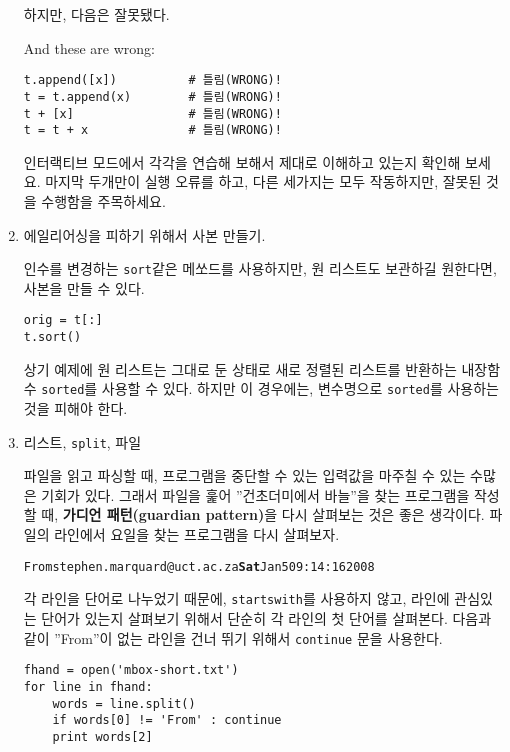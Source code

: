 \begin{enumerate}
하지만, 다음은 잘못됐다.

And these are wrong:

\beforeverb
\begin{verbatim}
t.append([x])          # 틀림(WRONG)!
t = t.append(x)        # 틀림(WRONG)!
t + [x]                # 틀림(WRONG)!
t = t + x              # 틀림(WRONG)!
\end{verbatim}
\afterverb

인터랙티브 모드에서 각각을 연습해 보해서 제대로 이해하고 있는지 확인해 보세요.
마지막 두개만이 실행 오류를 하고, 다른 세가지는 모두 작동하지만, 잘못된 것을 수행함을 주목하세요.

\item 에일리어싱을 피하기 위해서 사본 만들기.


인수를 변경하는 {\tt sort}같은 메쏘드를 사용하지만, 원 리스트도 보관하길 원한다면, 사본을 만들 수 있다.

\beforeverb
\begin{verbatim}
orig = t[:]
t.sort()
\end{verbatim}
\afterverb

상기 예제에 원 리스트는 그대로 둔 상태로 새로 정렬된 리스트를 반환하는 내장함수 {\tt sorted}를 사용할 수 있다.
하지만 이 경우에는, 변수명으로 {\tt sorted}를 사용하는 것을 피해야 한다.


\item 리스트, {\tt split}, 파일

파일을 읽고 파싱할 때, 프로그램을 중단할 수 있는 입력값을 마주칠 수 있는 수많은 기회가 있다.
그래서 파일을 훑어 ''건초더미에서 바늘''을 찾는 프로그램을 작성할 때, {\bf 가디언 패턴(guardian pattern)}을 다시 살펴보는 것은 좋은 생각이다.
파일의 라인에서 요일을 찾는 프로그램을 다시 살펴보자.

\beforeverb
\begin{alltt}
From stephen.marquard@uct.ac.za {\bf Sat} Jan  5 09:14:16 2008
\end{alltt}
\afterverb

각 라인을 단어로 나누었기 때문에, {\tt startswith}를 사용하지 않고, 라인에 관심있는 단어가 있는지 살펴보기 위해서 단순히 각 라인의 첫 단어를 살펴본다.
다음과 같이 ''From''이 없는 라인을 건너 뛰기 위해서 {\tt continue} 문을 사용한다.

\beforeverb
\begin{verbatim}
fhand = open('mbox-short.txt')
for line in fhand:
    words = line.split()
    if words[0] != 'From' : continue
    print words[2]
\end{verbatim}
\afterverb
%


\end{enumerate}
